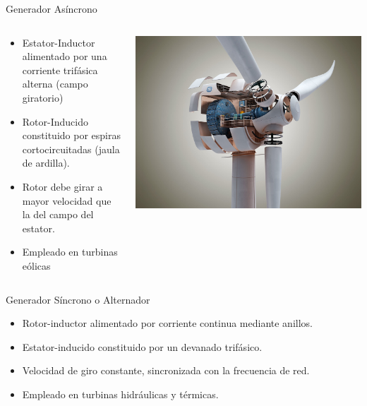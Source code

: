 \documentclass[xcolor={usenames,svgnames,dvipsnames}]{beamer}
\begin{document}
\begin{frame}[label={sec:org4307221}]{Generador Asíncrono}
\begin{columns}
\begin{column}{0.6\columnwidth}
\begin{itemize}
\item Estator-Inductor alimentado por una corriente trifásica alterna (campo giratorio)

\item Rotor-Inducido constituido por espiras cortocircuitadas (jaula de
ardilla).

\item Rotor debe girar a mayor velocidad que la del campo del estator.

\item Empleado en turbinas eólicas
\end{itemize}
\end{column}
\begin{column}{0.5\columnwidth}
\begin{center}
\includegraphics[width=.9\linewidth]{../figs/InsideWindTurbine.jpg}
\end{center}
\end{column}
\end{columns}
\end{frame}

\begin{frame}[label={sec:org6c62a42}]{Generador Síncrono o Alternador}
\begin{itemize}
\item Rotor-inductor alimentado por corriente continua mediante anillos.

\item Estator-inducido constituido por un devanado trifásico.

\item Velocidad de giro constante, sincronizada con la frecuencia de red.

\item Empleado en turbinas hidráulicas y térmicas.
\end{itemize}
\end{frame}
\end{document}
